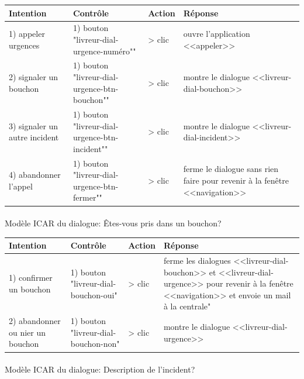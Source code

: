 \documentclass{report}
\begin{document}
\begin{longtable}{|p{3cm}|p{4cm}|p{2cm}|p{5cm}|}
\hline
Intention&Contrôle&Action&Réponse\\\hline
1) appeler urgences&1) bouton \newline
"livreur-dial-urgence-numéro""&> clic&ouvre l'application <<appeler>>\\\hline
2) signaler un bouchon&1) bouton \newline
"livreur-dial-urgence-btn-bouchon""&> clic&montre le dialogue <<livreur-dial-bouchon>>\\\hline
3) signaler un autre incident&1) bouton \newline
"livreur-dial-urgence-btn-incident""&> clic&montre le dialogue <<livreur-dial-incident>>\\\hline
4) abandonner l'appel&1) bouton \newline
"livreur-dial-urgence-btn-fermer""&> clic&ferme le dialogue sans rien faire pour revenir à la fenêtre <<navigation>>\\\hline
\end{longtable}

\paragraph{}
Modèle ICAR du dialogue: Êtes-vous pris dans un bouchon?

\begin{longtable}{|p{3cm}|p{4cm}|p{2cm}|p{5cm}|}
\hline
Intention&Contrôle&Action&Réponse\\\hline
1) confirmer un bouchon&1) bouton \newline
"livreur-dial-bouchon-oui"&> clic&ferme les dialogues <<livreur-dial-bouchon>> et <<livreur-dial-urgence>> pour revenir à la fenêtre <<navigation>> et envoie un mail à la centrale"\\\hline
2) abandonner ou nier un bouchon&1) bouton \newline
"livreur-dial-bouchon-non"&> clic&montre le dialogue <<livreur-dial-urgence>>\\\hline
\end{longtable}

\paragraph{}
Modèle ICAR du dialogue: Description de l'incident?
\end{document}
